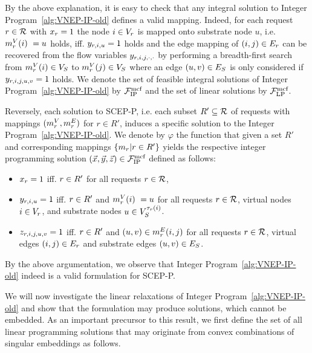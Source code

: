 \documentclass[10pt, conference, letterpaper]{IEEEtran}
\begin{document}
By the above explanation, it is easy to check that any integral solution to Integer Program~\ref{alg:VNEP-IP-old} defines a valid mapping. Indeed, for each request $\req \in \requests$ with $x_\req = 1$ the node $i\in \VV$ is mapped onto substrate node $u$, i.e. $\mapV(i)~= u$ holds, iff. $y_{\req, i,u} = 1$ holds and the edge mapping of $(i,j) \in  \VE$ can be recovered from the flow variables $y_{\req,i,j,\cdot,\cdot}$ by performing a breadth-first search from $\mapV(i) \in  \SV $ to $\mapV(j) \in  \SV$ where an edge $(u,v)\in \SE$ is only considered if $y_{\req,i,j,u,v} = 1$ holds. We denote the set of feasible integral solutions of Integer Program~\ref{alg:VNEP-IP-old} by $\spaceIP$ and the set of linear solutions by $\spaceLP$.

Reversely, each solution to SCEP-P, i.e. each subset $R'\subseteq \requests$ of requests with mappings $(\mapV,\mapE)$ for $r \in R'$, induces a specific solution to the Integer Program~\ref{alg:VNEP-IP-old}. We denote by $\varphi$ the function that given a set $R'$ and corresponding mappings $\{\map | r \in R'\}$ yields the respective integer programming solution $(\vec{x}, \vec{y}, \vec{z}) \in  \spaceIP$ defined as follows:

\begin{itemize}
\item $x_{\req} = 1$ iff. $\req \in R'$ for all requests $\req \in \requests$,
\item $y_{\req, i, u} = 1$ iff. $\req \in R'$ and $\mapV(i)~= u $ for all requests $\req \in \requests$, virtual nodes $i \in \VV$, and substrate nodes $u \in \SVTypes[\Vtype(i)]$.
\item $z_{\req, i,j,u,v} = 1$ iff. $\req \in R'$ and $(u,v) \in  \mapE(i,j)$ for all requests $\req \in \requests$, virtual edges $(i,j) \in  \VE$ and substrate edges $(u,v) \in  \SE$.
\end{itemize}

By the above argumentation, we observe that Integer Program~\ref{alg:VNEP-IP-old} indeed is a valid formulation for SCEP-P. 

We will now investigate the linear relaxations of Integer Program~\ref{alg:VNEP-IP-old} and show that the formulation may produce solutions, which cannot be embedded. As an important precursor to this result, we first define the set of all linear programming solutions that may originate from convex combinations of singular embeddings as follows.
\end{document}
